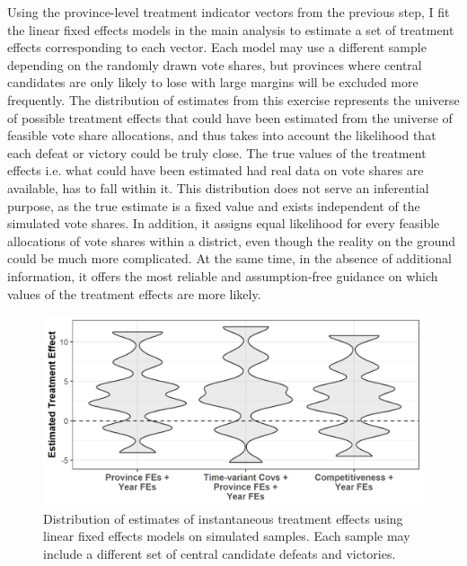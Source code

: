 \documentclass[12pt]{article}
\newcommand{\1}{\mathbbm{1}}
\begin{document}
Using the province-level treatment indicator vectors from the previous step, I fit the linear fixed effects models in the main analysis to estimate a set of treatment effects corresponding to each vector. Each model may use a different sample depending on the randomly drawn vote shares, but provinces where central candidates are only likely to lose with large margins will be excluded more frequently. The distribution of estimates from this exercise represents the universe of possible treatment effects that could have been estimated from the universe of feasible vote share allocations, and thus takes into account the likelihood that each defeat or victory could be truly close. The true values of the treatment effects i.e. what could have been estimated had real data on vote shares are available, has to fall within it. This distribution does not serve an inferential purpose, as the true estimate is a fixed value and exists independent of the simulated vote shares. In addition, it assigns equal likelihood for every feasible allocations of vote shares within a district, even though the reality on the ground could be much more complicated. At the same time, in the absence of additional information, it offers the most reliable and assumption-free guidance on which values of the treatment effects are more likely.

\begin{figure}[!htbp]
	\centering
	\includegraphics[width=.75\textwidth]{figure/200202_impute_results_2011.png}
	\captionsetup{singlelinecheck=off}
	\caption[Estimated linear fixed effects treatment effects using simulated vote shares]{Distribution of estimates of instantaneous treatment effects using linear fixed effects models on simulated samples. Each sample may include a different set of central candidate defeats and victories.}
	\label{fig:impute_results_2011}
\end{figure}
\end{document}
